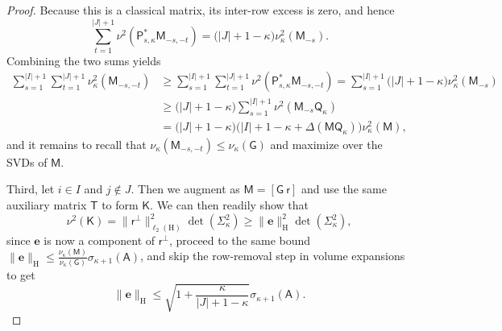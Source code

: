 \documentclass[onefignum,onetabnum]{siamart250211}
\renewenvironment{equation*}{\[}{\]\ignorespacesafterend}
\newcommand{\Hilb}{\mathrm{H}}
\newcommand{\Batrix}[1]{\bm{\Matrix{#1}}}
\newcommand{\Matrix}[1]{\mathsf{#1}}
\newcommand{\Bentry}[1]{{\bm{#1}}}
\newcommand{\Index}[1]{{#1}}
\newcommand{\Norm}[3][]{#1\| #2 #1\|_{\mathrm{#3}}}
\begin{document}
\begin{proof}
Because this is a classical matrix, its inter-row excess is zero, and hence
\begin{equation*}
    \sum_{t = 1}^{|\Index{J}| + 1} \nu^2(\Batrix{P}_{s,\kappa}^\ast \Batrix{M}_{-s,-t}) = \Big(|\Index{J}| + 1 - \kappa \Big) \nu_{\kappa}^2(\Batrix{M}_{-s}).
\end{equation*}
Combining the two sums yields
\begin{align*}
    \sum_{s = 1}^{|\Index{I}| + 1} \sum_{t = 1}^{|\Index{J}| + 1} \nu_{\kappa}^2(\Batrix{M}_{-s,-t}) &\geq \sum_{s = 1}^{|\Index{I}| + 1} \sum_{t = 1}^{|\Index{J}| + 1} \nu^2(\Batrix{P}_{s,\kappa}^\ast \Batrix{M}_{-s,-t}) = \sum_{s = 1}^{|\Index{I}| + 1} \Big(|\Index{J}| + 1 - \kappa \Big) \nu_{\kappa}^2(\Batrix{M}_{-s}) \\
    &\geq \Big(|\Index{J}| + 1 - \kappa \Big) \sum_{s = 1}^{|\Index{I}| + 1} \nu^2(\Batrix{M}_{-s} \Matrix{Q}_\kappa) \\
    &= \Big(|\Index{J}| + 1 - \kappa \Big) \Big(|\Index{I}| + 1 - \kappa + \Delta(\Batrix{M} \Matrix{Q}_\kappa) \Big) \nu_{\kappa}^2(\Batrix{M}),
\end{align*}
and it remains to recall that $\nu_{\kappa}(\Batrix{M}_{-s,-t}) \leq \nu_{\kappa}(\Batrix{G})$ and maximize over the SVDs of $\Batrix{M}$.

Third, let $i \in \Index{I}$ and $j \not\in \Index{J}$.
Then we augment as $\Batrix{M} = [\Batrix{G}~\Batrix{r}]$ and use the same auxiliary matrix $\Matrix{T}$ to form $\Batrix{K}$.
We can then readily show that 
\begin{equation*}
    \nu^2(\Batrix{K}) = \Norm{\Batrix{r}^\perp}{\ell_2(\Hilb)}^2 \det(\Matrix{\Sigma}_{\kappa}^2) \geq \Norm{\Bentry{e}}{\Hilb}^2 \det(\Matrix{\Sigma}_{\kappa}^2),
\end{equation*}
since $\Bentry{e}$ is now a component of $\Batrix{r}^\perp$, proceed to the same bound $\Norm{\Bentry{e}}{\Hilb} \leq \tfrac{\nu_{\kappa}(\Batrix{M})}{\nu_{\kappa}(\Batrix{G})} \sigma_{\kappa + 1}(\Batrix{A})$, and skip the row-removal step in volume expansions to get
\begin{equation*}
    \Norm{\Bentry{e}}{\Hilb} \leq \sqrt{1 + \frac{\kappa}{|\Index{J}| + 1 - \kappa}} \sigma_{\kappa + 1}(\Batrix{A}).
\end{equation*}


\end{proof}
\end{document}
